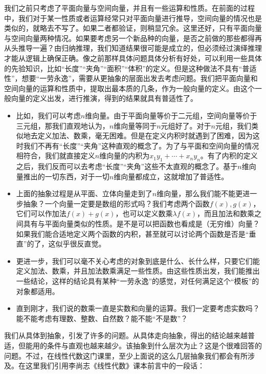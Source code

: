 \documentclass[hyperref,]{ctexart}
\begin{document}
我们之前只考虑了平面向量与空间向量，并且有一些运算和性质。在前面的过程中，我们对于某一性质或者运算经常只对平面向量进行推导，空间向量的情况也是类似的，就略去不写了。如果二者都验证，则稍显冗余。这里还好，只有平面向量与空间向量两种情况。如果要考虑另一个新品种的向量，是否之前做的那些都得再从头推导一遍？由归纳推理，我们知道结果很可能是成立的，但必须经过演绎推理才能从逻辑上确保正确。像之前那样具体问题具体分析有好处，可以利用一些具体的先验知识，比如``长度''``夹角''``面积''``体积''的定义。但是这种做法不具有``普适性''，想要``一劳永逸''，需要从更抽象的层面出发去考虑问题。我们把平面向量和空间向量的运算和性质中，提取出最本质的几条，作为一般向量的定义。由这个一般向量的定义出发，进行推演，得到的结果就具有普适性了。

\begin{itemize}
\item
  比如，我们可以考虑\(n\)维向量。由于平面向量等价于二元组，空间向量等价于三元组，那我们直观地认为，\(n\)维向量等同于\(n\)元组好了。对于\(n\)元组，我们类似地去定义加法、数乘，毫无困难。但是在定义内积时就遇到了困难，因为这时我们不再有``长度''``夹角''这种直观的概念了。为了与平面和空间向量的情况相符合，我们就直接定义\(n\)维向量的内积为\(x_1y_1+\cdots+x_ny_n\)。有了内积的定义之后，我们反而可以去考虑``长度''``夹角''这些不太直观的概念了。基于\(n\)维向量推出的一切东西，对于一切\(n\)维向量都成立，这就增加了普适性。
\item
  上面的抽象过程是从平面、立体向量走到了\(n\)维向量，那么我们能不能更进一步抽象？一个向量一定要是数组的形式吗？我们考虑两个函数\(f(x),g(x)\)，它们可以作加法\(f(x)+g(x)\)，也可以定义数乘\(\lambda f(x)\)，而且加法和数乘之间具有与平面向量类似的性质。是不是可以把函数也看成是（无穷维）向量？如果我们能合适地定义两个函数的内积，甚至就可以讨论两个函数是否是``垂直''的了，这似乎很反直觉。
\item
  更进一步，我们可以毫不关心考虑的对象到底是什么、长什么样，只要它们能定义加法、数乘，并且加法数乘满足一些性质。由这些性质出发，我们能推出一些结论，这样的结论具有某种``一劳永逸''的感觉，对任何满足这个``模板''的对象都适用。
\item
  直到刚才，我们说的数乘一直是实数和向量的运算。我们一定要考虑实数吗？能不能考虑有理数、整数、自然数？能不能``不是数''？
\end{itemize}

我们从具体到抽象，引发了许多的问题。从具体走向抽象，得出的结论越来越普适，但能用的条件与直观也越来越少。该抽象到什么层次为止？这是个很难回答的问题。不过，在线性代数这门课里，至少上面说的这么几层抽象我们都会有所涉及。在这里我们引用李尚志《线性代数》课本前言中的一段话：
\end{document}
